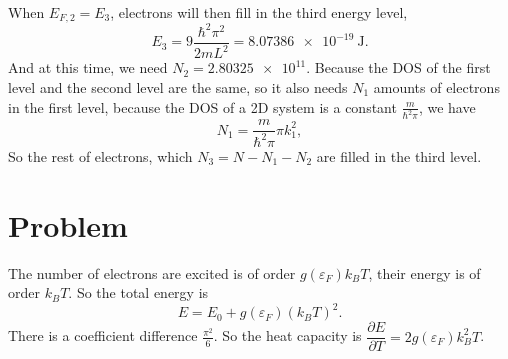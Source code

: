 \documentclass[12pt]{article}
\newcommand*{\RMN}[1]{\uppercase\expandafter{\romannumeral#1}}
\begin{document}
\begin{enumerate}[(a)]
	      When $E_{F,2} = E_3$, electrons will then fill in the third energy level,
	      \begin{equation}
	      	E_3 = 9 \frac{\hbar^2\pi^2}{2m L^2} = \SI{8.07386e-19}{\joule}.
	      \end{equation}
	      And at this time, we need $N_2 = \num{2.80325e11}$. Because the DOS of the first level and the second level are the same, so it also needs $N_1$ amounts of electrons in the first level,
	      because the DOS of a 2D system is a constant $\frac{m}{\hbar^2\pi}$, we have
	      \begin{equation}
	      	N_1 = \frac{m}{\hbar^2\pi} \pi k_1^2,
	      \end{equation}
	      So the rest of electrons, which $N_3= N - N_1 -N_2$ are filled in the third level.
\end{enumerate}





\section*{Problem \RMN{4}}

The number of electrons are excited is of order $g(\varepsilon_F)k_B T$, their energy is of order $k_B T$.
So the total energy is
\begin{equation}
	E = E_0 + g(\varepsilon_F) (k_B T)^2.
\end{equation}
There is a coefficient difference $\frac{\pi^2}{6}$.
So the heat capacity is $\dfrac{\partial E}{\partial T} =2 g(\varepsilon_F) k_B^2 T$.












\end{document}
